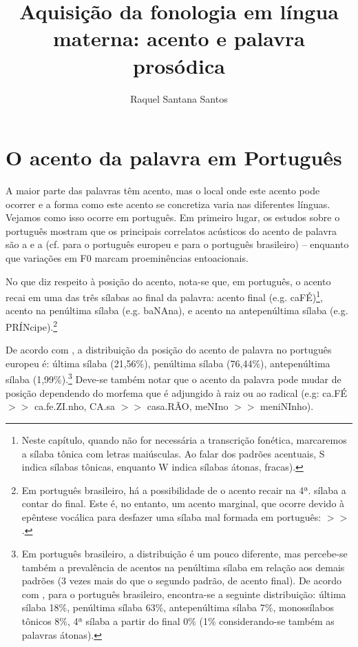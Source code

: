 \documentclass[output=paper]{LSP/langsci}
\author{Raquel Santana Santos\affiliation{Universidade de São Paulo}
}
\title{Aquisição da fonologia em língua materna: acento e
palavra prosódica}
\begin{document}
\section{O acento da palavra em Português}
\label{sec:santana_acento}

A maior parte das palavras têm acento, mas o local onde este acento pode ocorrer e a forma como este acento se concretiza varia nas diferentes línguas. Vejamos como isso ocorre em português. Em primeiro lugar, os estudos sobre o português mostram que os principais correlatos acústicos do acento de palavra são a  e a  (cf. \citealt{delgadomartins2002} para o português europeu e \citealt{barbosa2006} para o português brasileiro) -- enquanto que variações em F0 marcam proeminências entoacionais.

No que diz respeito à posição do acento, nota-se que, em português, o acento recai em uma das três sílabas ao final da palavra: acento final (e.g. caFÉ)\footnote{Neste capítulo, quando não for necessária a transcrição fonética, marcaremos a sílaba tônica com letras maiúsculas. Ao falar dos padrões acentuais, S indica sílabas tônicas, enquanto W indica sílabas átonas, fracas).}, acento na penúltima sílaba (e.g. baNAna), e acento na antepenúltima sílaba (e.g. PRÍNcipe).\footnote{Em português brasileiro, há a possibilidade de o acento recair na 4ª. sílaba a contar do final. Este é, no entanto, um acento marginal, que ocorre devido à epêntese vocálica para desfazer uma sílaba mal formada em português:  $>>$ \textipa{[\pstr tE.ki.ni.ka]}.}

De acordo com \citealt{vigario_etal2006}, a distribuição da posição do acento de palavra no português europeu é: última sílaba (21,56\%), penúltima sílaba (76,44\%), antepenúltima sílaba (1,99\%).\footnote{Em português brasileiro, a distribuição é um pouco diferente, mas percebe-se também a prevalência de acentos na penúltima sílaba em relação aos demais padrões (3 vezes mais do que o segundo padrão, de acento final). De acordo com \citet{cintra1997}, para o português brasileiro, encontra-se a seguinte distribuição: última sílaba 18\%, penúltima sílaba 63\%, antepenúltima sílaba 7\%, monossílabos tônicos 8\%, 4ª sílaba a partir do final 0\% (1\% considerando-se também as palavras átonas).} Deve-se também notar que o acento da palavra pode mudar de posição dependendo do morfema que é adjungido à raiz ou ao radical (e.g: ca.FÉ $>>$ ca.fe.ZI.nho, CA.sa $>>$ casa.RÃO, meNIno $>>$ meniNInho).
\end{document}
